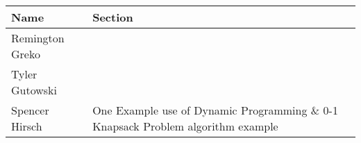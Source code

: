 \documentclass{article}
\begin{document}
\pagebreak

\begin{center}
        \begin{tabular}{|p{3cm}|p{6cm}|}
            \hline
            \textbf{Name} & \textbf{Section} \\
            \hline
            Remington Greko &  \\
            \hline
            Tyler Gutowski &  \\
            \hline
            Spencer Hirsch & One Example use of Dynamic Programming $\&$ 0-1 Knapsack Problem algorithm example\\
            \hline
        \end{tabular}
    \end{center}
    
\end{document}
